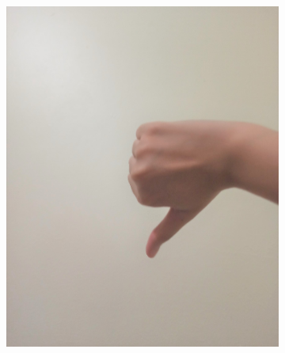 \documentclass[conference]{IEEEtran}
\begin{document}
\begin{figure} [h]
\begin{center}
\begin{subfigure}[t]{0.11\textwidth}
				\includegraphics[width=\textwidth]{img/pola8b.jpg}
				\caption{\label{fig:gs8b}}
			\end{subfigure}
			\hspace{0.1em}
			\begin{subfigure}[t]{0.11\textwidth}
				\centering

\end{subfigure}
\end{center}
\end{figure}
\end{document}
